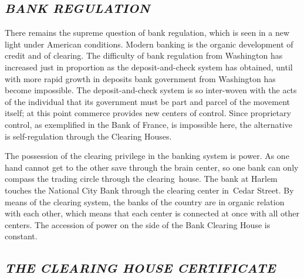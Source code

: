\documentclass[twoside,symmetric,nobib,justified]{tufte-book}
\begin{document}
\hypertarget{bank-regulation}{%
\subsection{\texorpdfstring{\emph{BANK
REGULATION}}{BANK REGULATION}}\label{bank-regulation}}

There remains the supreme question of bank regulation, which is seen in
a new light under American conditions. Modern banking is the organic
development of credit and of clearing. The difficulty of bank regulation
from Washington has increased just in proportion as the
deposit-and-check system has obtained, until with more rapid growth in
deposits bank government from Washington has become impossible. The
deposit-and-check system is so inter-woven with the acts of the
individual that its government must be part and parcel of the movement
itself; at this point commerce provides new centers of control. Since
proprietary control, as exemplified in the Bank of France, is impossible
here, the alternative is self-regulation through the Clearing Houses. ~

The possession of the clearing privilege in the banking system is power.
As one hand cannot get to the other save through the brain center, so
one bank can only compass the trading circle through the clearing~house.
The bank at Harlem touches the National City Bank through the clearing
center in~Cedar Street. By means of the clearing system, the banks of
the country are in organic relation with each other, which means that
each center is connected at once with all other centers. The accession
of power on the side of the Bank Clearing House is constant.~

\hypertarget{the-clearing-house-certificate}{%
\subsection{\texorpdfstring{\emph{THE CLEARING HOUSE
CERTIFICATE}}{THE CLEARING HOUSE CERTIFICATE}}\label{the-clearing-house-certificate}}
\end{document}
